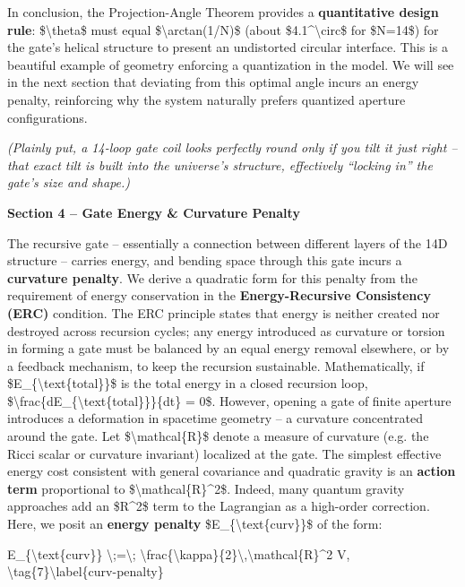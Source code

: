 \documentclass[]{article}
\begin{document}
In conclusion, the Projection-Angle Theorem provides a
\textbf{quantitative design rule}: \$\textbackslash{}theta\$ must equal
\$\textbackslash{}arctan(1/N)\$ (about \$4.1\^{}\textbackslash{}circ\$
for \$N=14\$) for the gate's helical structure to present an undistorted
circular interface. This is a beautiful example of geometry enforcing a
quantization in the model. We will see in the next section that
deviating from this optimal angle incurs an energy penalty, reinforcing
why the system naturally prefers quantized aperture configurations.

\emph{(Plainly put, a 14-loop gate coil looks perfectly round only if
you tilt it just right -- that exact tilt is built into the universe's
structure, effectively ``locking in'' the gate's size and shape.)}

\textbf{Section 4 -- Gate Energy \& Curvature Penalty}

The recursive gate -- essentially a connection between different layers
of the 14D structure -- carries energy, and bending space through this
gate incurs a \textbf{curvature penalty}. We derive a quadratic form for
this penalty from the requirement of energy conservation in the
\textbf{Energy-Recursive Consistency (ERC)} condition. The ERC principle
states that energy is neither created nor destroyed across recursion
cycles; any energy introduced as curvature or torsion in forming a gate
must be balanced by an equal energy removal elsewhere, or by a feedback
mechanism, to keep the recursion sustainable. Mathematically, if
\$E\_\{\textbackslash{}text\{total\}\}\$ is the total energy in a closed
recursion loop,
\$\textbackslash{}frac\{dE\_\{\textbackslash{}text\{total\}\}\}\{dt\} =
0\$. However, opening a gate of finite aperture introduces a deformation
in spacetime geometry -- a curvature concentrated around the gate. Let
\$\textbackslash{}mathcal\{R\}\$ denote a measure of curvature (e.g. the
Ricci scalar or curvature invariant) localized at the gate. The simplest
effective energy cost consistent with general covariance and quadratic
gravity is an \textbf{action term} proportional to
\$\textbackslash{}mathcal\{R\}\^{}2\$. Indeed, many quantum gravity
approaches add an \$R\^{}2\$ term to the Lagrangian as a high-order
correction. Here, we posit an \textbf{energy penalty}
\$E\_\{\textbackslash{}text\{curv\}\}\$ of the form:

E\_\{\textbackslash{}text\{curv\}\} \textbackslash{};=\textbackslash{};
\textbackslash{}frac\{\textbackslash{}kappa\}\{2\}\textbackslash{},\textbackslash{}mathcal\{R\}\^{}2
V, \textbackslash{}tag\{7\}\textbackslash{}label\{curv-penalty\}
\end{document}
